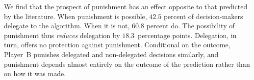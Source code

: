 We find that the prospect of punishment has an effect opposite to that predicted by the literature. When punishment is possible, $42.5$ percent of decision-makers delegate to the algorithm. When it is not, $60.8$ percent do. The possibility of punishment thus \textit{reduces} delegation by $18.3$~percentage points. Delegation, in turn, offers no protection against punishment. Conditional on the outcome, Player~B punishes delegated and non-delegated decisions similarly, and punishment depends almost entirely on the outcome of the prediction rather than on how it was made.


